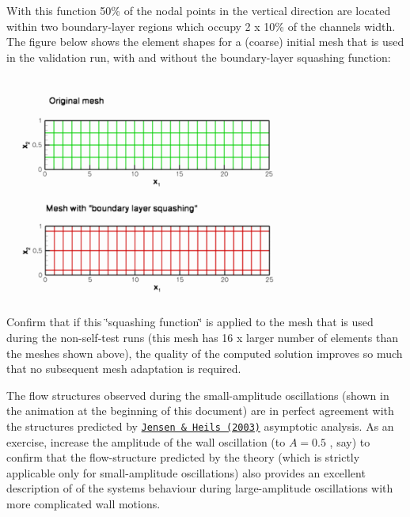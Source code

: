 \begin{DoxyEnumerate}
\begin{DoxyCodeInclude}
\end{DoxyCodeInclude}
 With this function 50\% of the nodal points in the vertical direction are located within two boundary-\/layer regions which occupy 2 x 10\% of the channel\textquotesingle{}s width. The figure below shows the element shapes for a (coarse) initial mesh that is used in the validation run, with and without the boundary-\/layer squashing function\+:  
\begin{DoxyImage}
\includegraphics[width=0.75\textwidth]{bl_squashing}
\end{DoxyImage}
 Confirm that if this \char`\"{}squashing function\char`\"{} is applied to the mesh that is used during the non-\/self-\/test runs (this mesh has 16 x larger number of elements than the meshes shown above), the quality of the computed solution improves so much that no subsequent mesh adaptation is required.
\item The flow structures observed during the small-\/amplitude oscillations (shown in the animation at the beginning of this document) are in perfect agreement with the structures predicted by \href{http://www.maths.man.ac.uk/~mheil/MATTHIAS/PDF/JensenHeil2003.pdf}{\tt Jensen \& Heil\textquotesingle{}s (2003)} asymptotic analysis. As an exercise, increase the amplitude of the wall oscillation (to $ A=0.5$ , say) to confirm that the flow-\/structure predicted by the theory (which is strictly applicable only for small-\/amplitude oscillations) also provides an excellent description of of the system\textquotesingle{}s behaviour during large-\/amplitude oscillations with more complicated wall motions. ~\newline
 ~\newline

\end{DoxyEnumerate}
